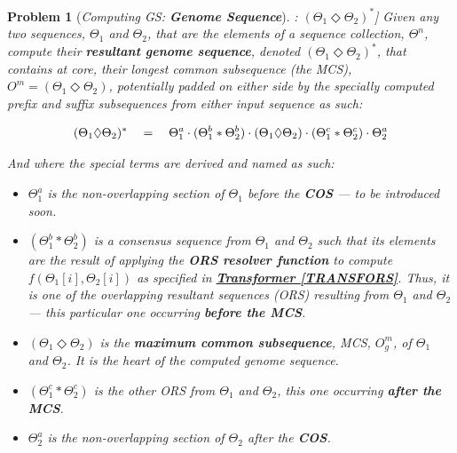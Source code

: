 \documentclass[a4paper, 18pt]{book} %
\newtheorem{prob}{Problem}
\begin{document}
\begin{prob}[\textit{Computing GS: \textbf{Genome Sequence}}]: $(\Theta_1 \Diamond \Theta_2)^*$] 
\label{PROBGS}
Given any two sequences, $\Theta_1$ and $\Theta_2$, that are the elements of a sequence collection, $\Theta^n$, compute their \textbf{resultant genome sequence}, denoted $(\Theta_1 \Diamond \Theta_2)^*$, that contains at core, their longest common subsequence (the MCS), $O^m = (\Theta_1 \Diamond \Theta_2)$, potentially padded on either side by the specially computed prefix and suffix subsequences from either input sequence as such:

\vspace{1em}
\begin{equation}
\label{EQGS}
(\Theta_1 \Diamond \Theta_2)^* \quad = \quad \Theta_1^a\cdot(\Theta_1^b \ast \Theta_2^b)\cdot(\Theta_1 \Diamond \Theta_2)\cdot(\Theta_1^c \ast \Theta_2^c)\cdot\Theta_2^a\\\\
\end{equation}
\vspace{1em}

And where the special terms are derived and named as such:

\begin{itemize}
\item $\Theta_1^a$ is the non-overlapping section of $\Theta_1$ before the \textbf{COS} --- to be introduced soon.
\item $(\Theta_1^b \ast \Theta_2^b)$ is a consensus sequence from $\Theta_1$ and $\Theta_2$ such that its elements are the result of applying the \textbf{ORS resolver function} to compute $f(\Theta_1[i],\Theta_2[i])$ as specified in \textbf{\hyperref[TRANSFORS]{Transformer \ref{TRANSFORS}}}. Thus, it is one of the overlapping resultant sequences (ORS) resulting from $\Theta_1$ and $\Theta_2$ --- this particular one occurring \textbf{before the MCS}.
\item $(\Theta_1 \Diamond \Theta_2)$ is the \textbf{maximum common subsequence}, MCS, $O^m_g$, of $\Theta_1$ and $\Theta_2$. It is the heart of the computed genome sequence.
\item $(\Theta_1^c \ast \Theta_2^c)$ is the other ORS from $\Theta_1$ and $\Theta_2$, this one occurring  \textbf{after the MCS}.
\item  $\Theta_2^a$ is the non-overlapping section of $\Theta_2$ after the \textbf{COS}.
\end{itemize}


\end{prob}
\end{document}
